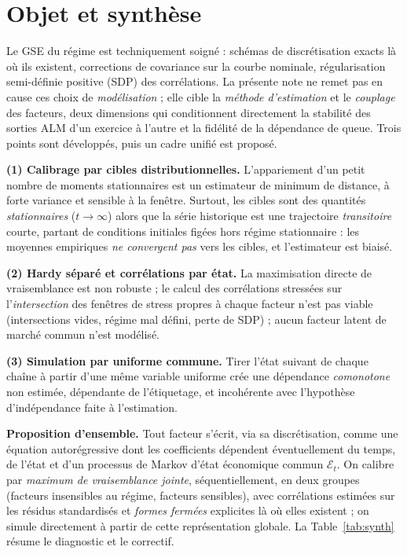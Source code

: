 \documentclass[11pt,a4paper]{article}
\theoremstyle{definition}
\newcommand{\Ecal}{\mathcal{E}}
\begin{document}
\section{Objet et synthèse}

Le GSE du régime est techniquement soigné : schémas de discrétisation exacts là où ils existent, corrections de covariance sur la courbe nominale, régularisation semi-définie positive (SDP) des corrélations. La présente note ne remet pas en cause ces choix de \emph{modélisation} ; elle cible la \emph{méthode d'estimation} et le \emph{couplage} des facteurs, deux dimensions qui conditionnent directement la stabilité des sorties ALM d'un exercice à l'autre et la fidélité de la dépendance de queue. Trois points sont développés, puis un cadre unifié est proposé.

\begin{insightbox}
\textbf{(1) Calibrage par cibles distributionnelles.} L'appariement d'un petit nombre de moments stationnaires est un estimateur de minimum de distance, à forte variance et sensible à la fenêtre. Surtout, les cibles sont des quantités \emph{stationnaires} ($t\to\infty$) alors que la série historique est une trajectoire \emph{transitoire} courte, partant de conditions initiales figées hors régime stationnaire : les moyennes empiriques \emph{ne convergent pas} vers les cibles, et l'estimateur est biaisé.

\textbf{(2) Hardy séparé et corrélations par état.} La maximisation directe de vraisemblance est non robuste ; le calcul des corrélations stressées sur l'\emph{intersection} des fenêtres de stress propres à chaque facteur n'est pas viable (intersections vides, régime mal défini, perte de SDP) ; aucun facteur latent de marché commun n'est modélisé.

\textbf{(3) Simulation par uniforme commune.} Tirer l'état suivant de chaque chaîne à partir d'une même variable uniforme crée une dépendance \emph{comonotone} non estimée, dépendante de l'étiquetage, et incohérente avec l'hypothèse d'indépendance faite à l'estimation.
\end{insightbox}

\noindent\textbf{Proposition d'ensemble.} Tout facteur s'écrit, via sa discrétisation, comme une équation autorégressive dont les coefficients dépendent éventuellement du temps, de l'état et d'un processus de Markov d'état économique commun $\Ecal_t$. On calibre par \emph{maximum de vraisemblance jointe}, séquentiellement, en deux groupes (facteurs insensibles au régime, facteurs sensibles), avec corrélations estimées sur les résidus standardisés et \emph{formes fermées} explicites là où elles existent ; on simule directement à partir de cette représentation globale. La Table~\ref{tab:synth} résume le diagnostic et le correctif.
\end{document}
